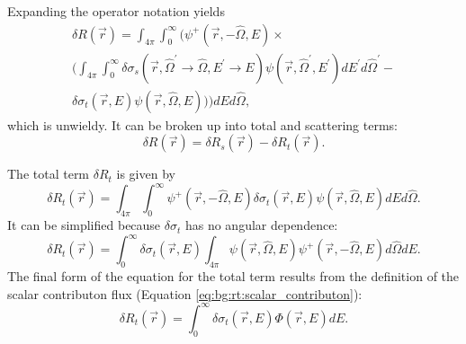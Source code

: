 Expanding the operator notation yields
\begin{multline}\label{eq:dr:dr_function_of_position_expanded}
  \delta R\left(\vec{r}\right) =
  \int_{4\pi}\int_0^\infty\Biggl(\psi^+\left(\vec{r},-\hat{\Omega},E\right) \times \\
  \Biggl(\int_{4\pi}\int_0^\infty\delta\sigma_s\left(\vec{r},\hat{\Omega}^\prime\rightarrow\hat{\Omega},E^\prime\rightarrow E\right)\psi\left(\vec{r},\hat{\Omega}^\prime,E^\prime\right)dE^\prime d\hat{\Omega}^\prime - \\
  \delta\sigma_t\left(\vec{r},E\right)\psi\left(\vec{r},\hat{\Omega},E\right)\Biggr)\Biggr)dEd\hat{\Omega},
\end{multline}
which is unwieldy.
It can be broken up into total and scattering terms:
\begin{equation}\label{eq:dr:dr_terms}
  \delta R\left(\vec{r}\right) =
  \delta R_s\left(\vec{r}\right) -
  \delta R_t\left(\vec{r}\right).
\end{equation}

The total term $\delta R_t$ is given by
\begin{equation}\label{eq:dr:dr_total_term_1}
  \delta R_t\left(\vec{r}\right) =
  \int_{4\pi}\int_0^\infty\psi^+\left(\vec{r},-\hat{\Omega},E\right)\delta\sigma_t\left(\vec{r},E\right)\psi\left(\vec{r},\hat{\Omega},E\right)dEd\hat{\Omega}.
\end{equation}
It can be simplified because $\delta\sigma_t$ has no angular dependence:
\begin{equation}\label{eq:dr:dr_total_term_2}
  \delta R_t\left(\vec{r}\right) =
  \int_0^\infty\delta\sigma_t\left(\vec{r},E\right)\int_{4\pi}\psi\left(\vec{r},\hat{\Omega},E\right)\psi^+\left(\vec{r},-\hat{\Omega},E\right)d\hat{\Omega}dE.
\end{equation}
The final form of the equation for the total term results from the definition of the scalar contributon flux (Equation \ref{eq:bg:rt:scalar_contributon}):
\begin{equation}\label{eq:dr:dr_total_term}
  \delta R_t\left(\vec{r}\right) =
  \int_0^\infty\delta\sigma_t\left(\vec{r},E\right)\Phi\left(\vec{r},E\right)dE.
\end{equation}

